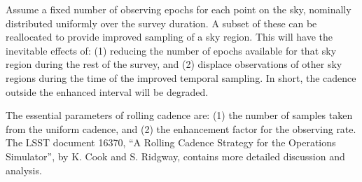 Assume a fixed number of observing epochs for each point on the sky,
nominally distributed uniformly over the survey duration.  A subset of
these can be reallocated to provide improved sampling of a sky region.
This will have the inevitable effects of: (1) reducing the number of
epochs available for that sky region during the rest of the survey, and
(2) displace observations of other sky regions during the time of the
improved temporal sampling.  In short, the cadence outside the enhanced
interval will be degraded.

The essential parameters of rolling cadence are: (1) the number of
samples taken from the uniform cadence, and (2) the enhancement factor
for the observing rate.  The LSST document 16370, ``A Rolling Cadence
Strategy for the Operations Simulator'', by K. Cook and S. Ridgway,
contains more detailed discussion and analysis.

